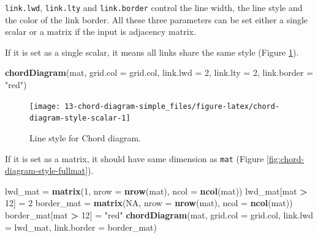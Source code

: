 \documentclass[]{book}
\newenvironment{Shaded}{\begin{snugshade}}{\end{snugshade}}
\newcommand{\KeywordTok}[1]{\textcolor[rgb]{0.13,0.29,0.53}{\textbf{#1}}}
\newcommand{\DataTypeTok}[1]{\textcolor[rgb]{0.13,0.29,0.53}{#1}}
\newcommand{\DecValTok}[1]{\textcolor[rgb]{0.00,0.00,0.81}{#1}}
\newcommand{\StringTok}[1]{\textcolor[rgb]{0.31,0.60,0.02}{#1}}
\newcommand{\OtherTok}[1]{\textcolor[rgb]{0.56,0.35,0.01}{#1}}
\newcommand{\OperatorTok}[1]{\textcolor[rgb]{0.81,0.36,0.00}{\textbf{#1}}}
\newcommand{\NormalTok}[1]{#1}
\begin{document}
\texttt{link.lwd}, \texttt{link.lty} and \texttt{link.border} control
the line width, the line style and the color of the link border. All
these three parameters can be set either a single scalar or a matrix if
the input is adjacency matrix.

If it is set as a single scalar, it means all links share the same style
(Figure \ref{fig:chord-diagram-style-scalar}).

\begin{Shaded}
\begin{Highlighting}[]
\KeywordTok{chordDiagram}\NormalTok{(mat, }\DataTypeTok{grid.col =}\NormalTok{ grid.col, }\DataTypeTok{link.lwd =} \DecValTok{2}\NormalTok{, }\DataTypeTok{link.lty =} \DecValTok{2}\NormalTok{, }\DataTypeTok{link.border =} \StringTok{"red"}\NormalTok{)}
\end{Highlighting}
\end{Shaded}

\begin{figure}

{\centering \texttt{[image: 13-chord-diagram-simple\_files/figure-latex/chord-diagram-style-scalar-1]} 

}

\caption{Line style for Chord diagram.}\label{fig:chord-diagram-style-scalar}
\end{figure}

If it is set as a matrix, it should have same dimension as \texttt{mat}
(Figure \ref{fig:chord-diagram-style-fullmat}).

\begin{Shaded}
\begin{Highlighting}[]
\NormalTok{lwd_mat =}\StringTok{ }\KeywordTok{matrix}\NormalTok{(}\DecValTok{1}\NormalTok{, }\DataTypeTok{nrow =} \KeywordTok{nrow}\NormalTok{(mat), }\DataTypeTok{ncol =} \KeywordTok{ncol}\NormalTok{(mat))}
\NormalTok{lwd_mat[mat }\OperatorTok{>}\StringTok{ }\DecValTok{12}\NormalTok{] =}\StringTok{ }\DecValTok{2}
\NormalTok{border_mat =}\StringTok{ }\KeywordTok{matrix}\NormalTok{(}\OtherTok{NA}\NormalTok{, }\DataTypeTok{nrow =} \KeywordTok{nrow}\NormalTok{(mat), }\DataTypeTok{ncol =} \KeywordTok{ncol}\NormalTok{(mat))}
\NormalTok{border_mat[mat }\OperatorTok{>}\StringTok{ }\DecValTok{12}\NormalTok{] =}\StringTok{ "red"}
\KeywordTok{chordDiagram}\NormalTok{(mat, }\DataTypeTok{grid.col =}\NormalTok{ grid.col, }\DataTypeTok{link.lwd =}\NormalTok{ lwd_mat, }\DataTypeTok{link.border =}\NormalTok{ border_mat)}
\end{Highlighting}
\end{Shaded}
\end{document}
